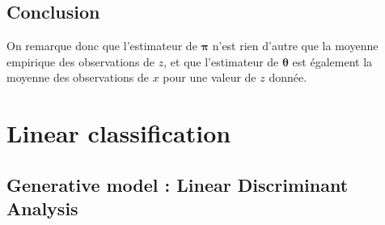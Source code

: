 \documentclass[12pt,a4paper,onecolumn]{article}
\begin{document}
\subsection{Conclusion}
On remarque donc que l'estimateur de \(\bm{\pi}\) n'est rien d'autre que la moyenne empirique des observations de \( z\), et que l'estimateur de \(\bm{\theta}\) est également la moyenne des observations de \( x\) pour une valeur de \( z \) donnée.

\section{Linear classification}

\subsection{Generative model : Linear Discriminant Analysis}
\end{document}
